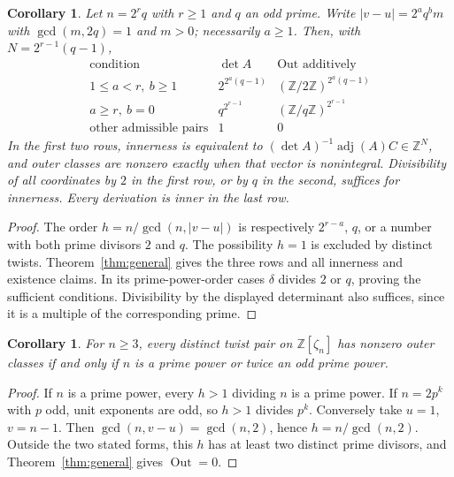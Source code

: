 \documentclass[11pt]{article}
\newtheorem{corollary}[theorem]{Corollary}
\newcommand{\ZZ}{\mathbb Z}
\newcommand{\Out}{\operatorname{Out}}
\newcommand{\adj}{\operatorname{adj}}
\begin{document}
\begin{corollary}\label{cor:twofactor}
Let $n=2^r q$ with $r\geq1$ and $q$ an odd prime. Write
$|v-u|=2^a q^b m$ with $\gcd(m,2q)=1$ and $m>0$; necessarily
$a\geq1$. Then, with $N=2^{r-1}(q-1)$,
\begin{equation}\label{eq:twofactor}
\begin{array}{c|c|c}
\text{condition}&\det A&\Out\text{ additively}\\\hline
1\leq a<r,\ b\geq1 &2^{2^a(q-1)} &(\ZZ/2\ZZ)^{2^a(q-1)}\\
a\geq r,\ b=0 &q^{2^{r-1}} &(\ZZ/q\ZZ)^{2^{r-1}}\\
\text{other admissible pairs}&1&0
\end{array}
\end{equation}
In the first two rows, innerness is equivalent to
$(\det A)^{-1}\adj(A)C\in\ZZ^N$, and outer classes are nonzero
exactly when that vector is nonintegral. Divisibility of all coordinates
by $2$ in the first row, or by $q$ in the second, suffices for innerness.
Every derivation is inner in the last row.
\end{corollary}
\begin{proof}
The order $h=n/\gcd(n,|v-u|)$ is respectively $2^{r-a}$, $q$, or a
number with both prime divisors $2$ and $q$. The possibility $h=1$ is
excluded by distinct twists. Theorem~\ref{thm:general} gives the three
rows and all innerness and existence claims. In its prime-power-order
cases $\delta$ divides $2$ or $q$, proving the sufficient conditions.
Divisibility by the displayed determinant also suffices, since it is
a multiple of the corresponding prime.
\end{proof}

\begin{corollary}\label{cor:universal}
For $n\geq3$, every distinct twist pair on $\ZZ[\zeta_n]$ has nonzero
outer classes if and only if $n$ is a prime power or twice an odd prime
power.
\end{corollary}
\begin{proof}
If $n$ is a prime power, every $h>1$ dividing $n$ is a prime power.
If $n=2p^k$ with $p$ odd, unit exponents are odd, so $h>1$ divides
$p^k$. Conversely take $u=1$, $v=n-1$. Then
$\gcd(n,v-u)=\gcd(n,2)$, hence $h=n/\gcd(n,2)$.
Outside the two stated forms, this $h$ has at least two distinct prime
divisors, and Theorem~\ref{thm:general} gives $\Out=0$.
\end{proof}
\end{document}
